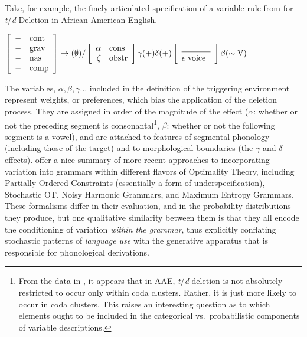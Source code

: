 Take, for example, the finely articulated specification of a variable rule from \citet{3288} for {\sl t}/{\sl d} Deletion in African American English.
\begin{exe}
 \ex $\left[\begin{array}{rl}
	-&\mbox{cont}\\
	-&\mbox{grav}\\
	-&\mbox{nas}\\
	-&\mbox{comp}
\end{array}\right] \rightarrow (\emptyset) / 
\left[
	\begin{array}{rl}
		\alpha & \mbox{cons}\\
		\zeta &  \mbox{obstr}
	\end{array}
\right]\gamma(\mbox{+})\delta(\mbox{+})
\left[
	\begin{array}{l}
	\underline{\hskip 35pt}\\
	\epsilon~\mbox{voice}
	\end{array}
\right]
\beta(\sim \mbox{V})$ \label{variable.rule}
\end{exe}
The variables, $\alpha, \beta, \gamma \ldots$ included in the definition of the triggering environment represent weights, or preferences, which bias the application of the deletion process. 
They are assigned in order of the magnitude of the effect ($\alpha$: whether or not the preceding segment is consonantal\footnote{From the data in \citet{3288}, it appears that in AAE, {\sl t}/{\sl d} deletion is not absolutely restricted to occur only within coda clusters.
Rather, it is just more likely to occur in coda clusters.
This raises an interesting question as to which elements ought to be included in the categorical vs.\ probabilistic components of variable descriptions.},
$\beta$: whether or not the following segment is a vowel), and are attached to features of segmental phonology (including those of the target) and to morphological boundaries (the $\gamma$ and $\delta$ effects).
\citet{Coetzee2011} offer a nice summary of more recent approaches to incorporating variation into grammars within different flavors of Optimality Theory, including Partially Ordered Constraints (essentially a form of underspecification), Stochastic OT, Noisy Harmonic Grammars, and Maximum Entropy Grammars.
These formalisms differ in their evaluation, and in the probability distributions they produce, but one qualitative similarity between them is that they all encode the conditioning of variation \emph{within the grammar}, thus explicitly conflating stochastic patterns of \textsl{language use} with the generative apparatus that is responsible for phonological derivations. 

